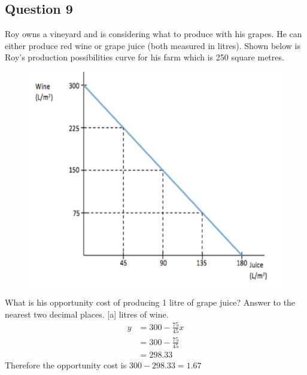 \subsection{Question 9}
Roy owns a vineyard and is considering what to produce with his grapes. He can either produce red wine or grape juice (both measured in litres). Shown below is Roy's production possibilities curve for his farm which is 250 square metres.
\begin{figure}[H]
	\centering
	\includegraphics[width=0.6\linewidth]{cml_1_2_9}
\end{figure}
What is his opportunity cost of producing 1 litre of grape juice? Answer to the nearest two decimal places. [a] litres of wine.
\begin{align*}
	y &= 300 - \frac{75}{45}x\\
	&= 300 - \frac{75}{45}\\
	&= 298.33
\end{align*}
Therefore the opportunity cost is $300 - 298.33 = 1.67$

